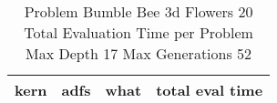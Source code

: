 \begin{table}[H]
\caption{Problem  Bumble Bee 3d  Flowers 20\\Total Evaluation Time per Problem \\ Max Depth 17 Max Generations 52\\}
\begin{center}
\scalebox{1.0} %
{
\begin{tabular}{lllr}
\hline
kern & adfs & what & total eval time \\
\hline


\end{tabular}
}
\end{center}
\end{table}


